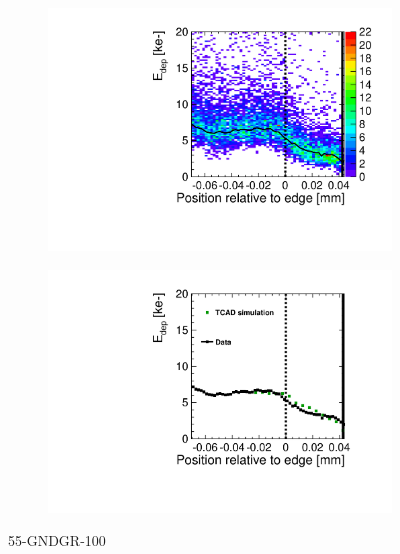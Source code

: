 \begin{figure}[htbp]
  \centering
  \begin{subfigure}[b]{0.5\linewidth}
    \includegraphics[width=\textwidth]{figures/ActiveEdge/TCAD_data_Edep_55_GNDGR_100.pdf}
    \caption{}
  \end{subfigure}\hfill
  \begin{subfigure}[b]{0.5\linewidth}
    \includegraphics[width=\textwidth]{figures/ActiveEdge/TCAD_data_55_GNDGR_100.pdf}
    \caption{}
  \end{subfigure}
  \caption{55-GNDGR-100}
  \label{fig:TCAD_vs_data_55_GNDGR_100}
\end{figure}



